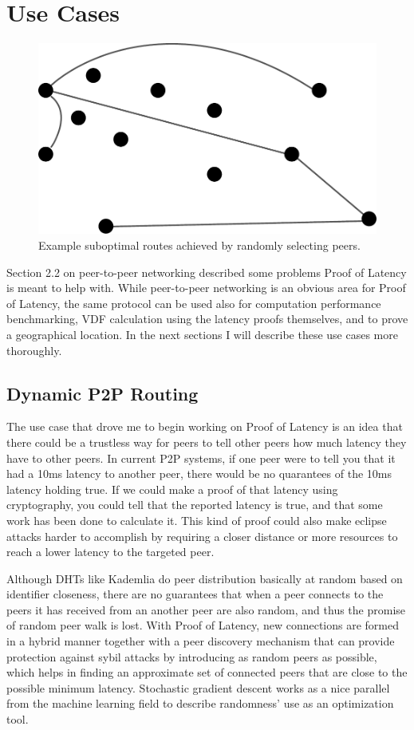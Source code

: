 \section{Use Cases}
\begin{figure}
	\includegraphics[width=\textwidth]{pictures/random_routing.pdf}
	\caption{Example suboptimal routes achieved by randomly selecting peers.}
	\label{Subobtimal Topology}
\end{figure}
Section 2.2 on peer-to-peer networking described some problems Proof of Latency is meant to help with. While peer-to-peer networking is an obvious area for Proof of Latency, the same protocol can be used also for computation performance benchmarking, VDF calculation using the latency proofs themselves, and to prove a geographical location. In the next sections I will describe these use cases more thoroughly.

\subsection{Dynamic P2P Routing}
The use case that drove me to begin working on Proof of Latency is an idea that there could be a trustless way for peers to tell other peers how much latency they have to other peers. In current P2P systems, if one peer were to tell you that it had a 10ms latency to another peer, there would be no quarantees of the 10ms latency holding true. If we could make a proof of that latency using cryptography, you could tell that the reported latency is true, and that some work has been done to calculate it. This kind of proof could also make eclipse attacks harder to accomplish by requiring a closer distance or more resources to reach a lower latency to the targeted peer.

Although DHTs like Kademlia do peer distribution basically at random based on identifier closeness, there are no guarantees that when a peer connects to the peers it has received from an another peer are also random, and thus the promise of random peer walk is lost. With Proof of Latency, new connections are formed in a hybrid manner together with a peer discovery mechanism that can provide protection against sybil attacks by introducing as random peers as possible, which helps in finding an approximate set of connected peers that are close to the possible minimum latency. Stochastic gradient descent works as a nice parallel from the machine learning field to describe randomness' use as an optimization tool.

